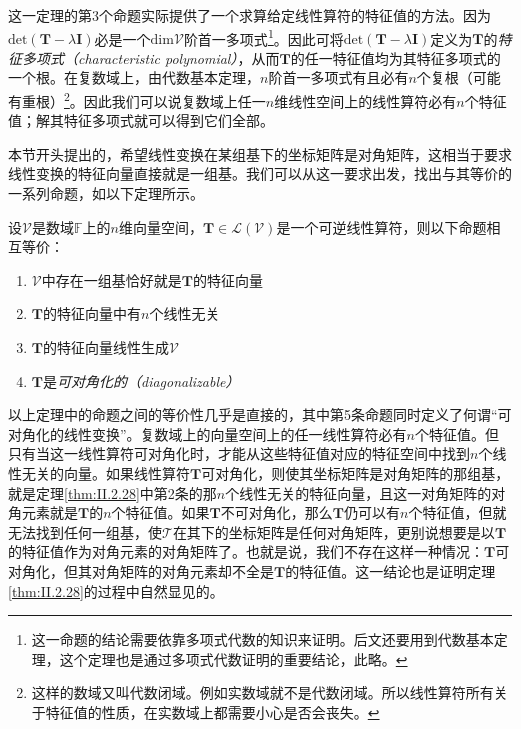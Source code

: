 \documentclass[main.tex]{subfiles}
\begin{document}
这一定理的第3个命题实际提供了一个求算给定线性算符的特征值的方法。因为$\mathrm{det}\left(\mathbf{T}-\lambda\mathbf{I}\right)$必是一个$\mathrm{dim}\mathcal{V}$阶首一多项式\footnote{这一命题的结论需要依靠多项式代数的知识来证明。后文还要用到代数基本定理，这个定理也是通过多项式代数证明的重要结论，此略\cite{Hoffman1971}。}。因此可将$\mathrm{det}\left(\mathbf{T}-\lambda\mathbf{I}\right)$定义为$\mathbf{T}$的\emph{特征多项式（characteristic polynomial）}，从而$\mathbf{T}$的任一特征值均为其特征多项式的一个根。在复数域上，由代数基本定理，$n$阶首一多项式有且必有$n$个复根（可能有重根）\footnote{这样的数域又叫代数闭域。例如实数域就不是代数闭域。所以线性算符所有关于特征值的性质，在实数域上都需要小心是否会丧失。}。因此我们可以说复数域上任一$n$维线性空间上的线性算符必有$n$个特征值；解其特征多项式就可以得到它们全部。

本节开头提出的，希望线性变换在某组基下的坐标矩阵是对角矩阵，这相当于要求线性变换的特征向量直接就是一组基。我们可以从这一要求出发，找出与其等价的一系列命题，如以下定理所示。

\begin{theorem}\label{thm:II.2.28}
    设$\mathcal{V}$是数域$\mathbb{F}$上的$n$维向量空间，$\mathbf{T}\in\mathcal{L}\left(\mathcal{V}\right)$是一个可逆线性算符，则以下命题相互等价：
    \begin{enumerate}
        \item $\mathcal{V}$中存在一组基恰好就是$\mathbf{T}$的特征向量
        \item $\mathbf{T}$的特征向量中有$n$个线性无关
        \item $\mathbf{T}$的特征向量线性生成$\mathcal{V}$
        \item $\mathbf{T}$是\emph{可对角化的（diagonalizable）}
    \end{enumerate}
\end{theorem}

以上定理中的命题之间的等价性几乎是直接的\cite[\S5.2 矩阵可对角化的条件]{周胜林2012线性代数}，其中第5条命题同时定义了何谓“可对角化的线性变换”。复数域上的向量空间上的任一线性算符必有$n$个特征值。但只有当这一线性算符可对角化时，才能从这些特征值对应的特征空间中找到$n$个线性无关的向量。如果线性算符$\mathbf{T}$可对角化，则使其坐标矩阵是对角矩阵的那组基，就是定理\ref{thm:II.2.28}中第2条的那$n$个线性无关的特征向量，且这一对角矩阵的对角元素就是$\mathbf{T}$的$n$个特征值。如果$\mathbf{T}$不可对角化，那么$\mathbf{T}$仍可以有$n$个特征值，但就无法找到任何一组基，使$\mathcal{T}$在其下的坐标矩阵是任何对角矩阵，更别说想要是以$\mathbf{T}$的特征值作为对角元素的对角矩阵了。也就是说，我们不存在这样一种情况：$\mathbf{T}$可对角化，但其对角矩阵的对角元素却不全是$\mathbf{T}$的特征值。这一结论也是证明定理\ref{thm:II.2.28}的过程中自然显见的。
\end{document}

